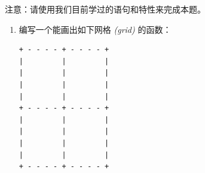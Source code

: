 \begin{exercise}


注意：请使用我们目前学过的语句和特性来完成本题。





\begin{enumerate}

\item 编写一个能画出如下网格 {\em (grid)} 的函数：

\begin{em}
\begin{lstlisting}
+ - - - - + - - - - +
|         |         |
|         |         |
|         |         |
|         |         |
+ - - - - + - - - - +
|         |         |
|         |         |
|         |         |
|         |         |
+ - - - - + - - - - +
\end{lstlisting}
\end{em}


\end{enumerate}
\end{exercise}
